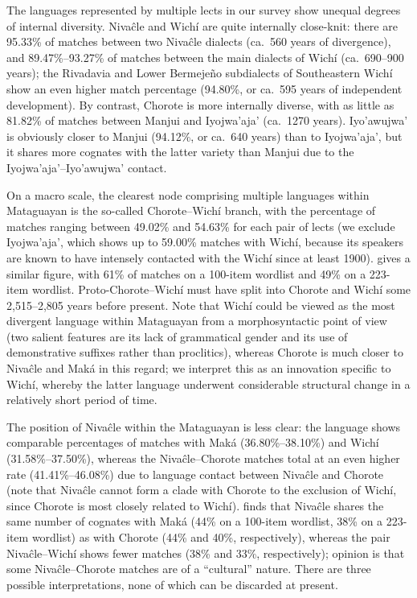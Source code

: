 The languages represented by multiple lects in our survey show unequal degrees of internal diversity. Nivaĉle and Wichí are quite internally close-knit: there are 95.33\% of matches between two Nivaĉle dialects (ca.~560 years of divergence), and 89.47\%--93.27\% of matches between the main dialects of Wichí (ca.~690--900 years); the Rivadavia and Lower Bermejeño subdialects of Southeastern Wichí show an even higher match percentage (94.80\%, or ca.~595 years of independent development). By contrast, Chorote is more internally diverse, with as little as 81.82\% of matches between Manjui and Iyojwa’aja’ (ca.~1270 years). Iyo’awujwa’ is obviously closer to Manjui (94.12\%, or ca.~640 years) than to Iyojwa’aja’, but it shares more cognates with the latter variety than Manjui due to the Iyojwa’aja’--Iyo’awujwa’ contact.

On a macro scale, the clearest node comprising multiple languages within Mataguayan is the so-called Chorote--Wichí branch, with the percentage of matches ranging between 49.02\% and 54.63\% for each pair of lects (we exclude Iyojwa’aja’, which shows up to 59.00\% matches with Wichí, because its speakers are known to have intensely contacted with the Wichí since at least 1900). \citet[371]{AT64} gives a similar figure, with 61\% of matches on a 100-item wordlist and 49\% on a 223-item wordlist. Proto-Chorote--Wichí must have split into Chorote and Wichí some 2,515--2,805 years before present. Note that Wichí could be viewed as the most divergent language within Mataguayan from a morphosyntactic point of view (two salient features are its lack of grammatical gender and its use of demonstrative suffixes rather than proclitics), whereas Chorote is much closer to Nivaĉle and Maká in this regard; we interpret this as an innovation specific to Wichí, whereby the latter language underwent considerable structural change in a relatively short period of time.

The position of Nivaĉle within the Mataguayan  is less clear: the language shows comparable percentages of matches with Maká (36.80\%--38.10\%) and Wichí (31.58\%--37.50\%), whereas the Nivaĉle--Chorote matches total at an even higher rate (41.41\%--46.08\%) due to language contact between Nivaĉle and Chorote (note that Nivaĉle cannot form a clade with Chorote to the exclusion of Wichí, since Chorote is most closely related to Wichí). \citet[371]{AT64} finds that Nivaĉle shares the same number of cognates with Maká (44\% on a 100-item wordlist, 38\% on a 223-item wordlist) as with Chorote (44\% and 40\%, respectively), whereas the pair Nivaĉle--Wichí shows fewer matches (38\% and 33\%, respectively);  opinion is that some Nivaĉle--Chorote matches are of a ``cultural'' nature. There are three possible interpretations, none of which can be discarded at present.

